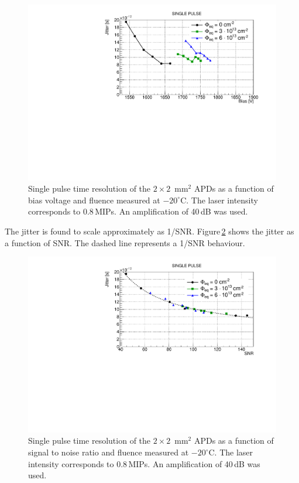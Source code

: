 \documentclass[3p,preprint,twocolumn]{elsarticle}
\begin{document}
\begin{figure}
  \centering
  \includegraphics[width = \columnwidth]{timeRes2x2APDsNo1e15}
  \caption{Single pulse time resolution of the $2 \times 2$~mm$^2$ APDs as a function of bias voltage and fluence measured at $-20^\circ$C. The laser intensity corresponds to 0.8\,MIPs. An amplification of 40\,dB was used.}
  \label{fig:timeRes2x2}
\end{figure}

The jitter is found to scale approximately as 1/SNR.
Figure\,\ref{fig:timeRes2x2_snr} shows the jitter as a function of SNR.
The dashed line represents a 1/SNR behaviour.

\begin{figure}
  \centering
  \includegraphics[width = \columnwidth]{timeRes2x2APDsNo1e15_SNR}
  \caption{Single pulse time resolution of the $2 \times 2$~mm$^2$ APDs as a function of signal to noise ratio and fluence measured at $-20^\circ$C. The laser intensity corresponds to 0.8\,MIPs. An amplification of 40\,dB was used.}
  \label{fig:timeRes2x2_snr}
\end{figure}
\end{document}
